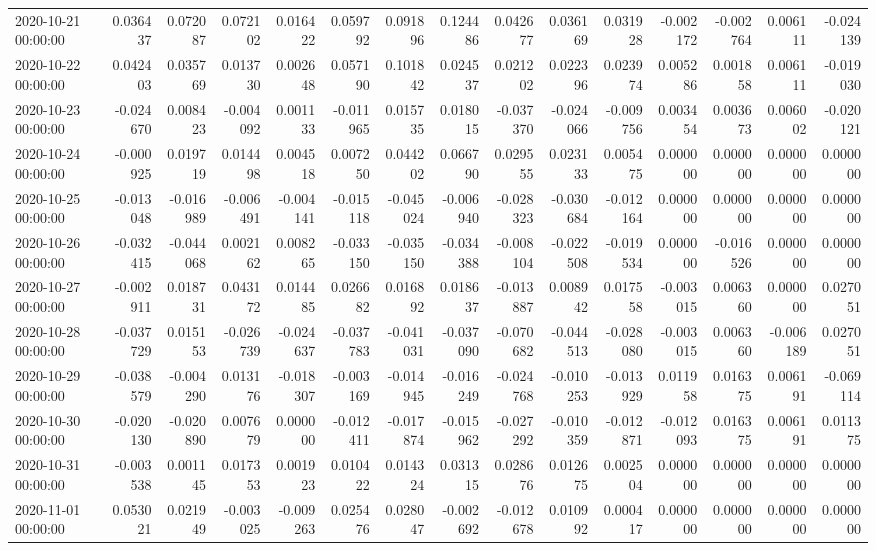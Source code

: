 \begin{tabular}{lrrrrrrrrrrrrrr}
2020-10-21 00:00:00 & 0.036437 & 0.072087 & 0.072102 & 0.016422 & 0.059792 & 0.091896 & 0.124486 & 0.042677 & 0.036169 & 0.031928 & -0.002172 & -0.002764 & 0.006111 & -0.024139 \\
2020-10-22 00:00:00 & 0.042403 & 0.035769 & 0.013730 & 0.002648 & 0.057190 & 0.101842 & 0.024537 & 0.021202 & 0.022396 & 0.023974 & 0.005286 & 0.001858 & 0.006111 & -0.019030 \\
2020-10-23 00:00:00 & -0.024670 & 0.008423 & -0.004092 & 0.001133 & -0.011965 & 0.015735 & 0.018015 & -0.037370 & -0.024066 & -0.009756 & 0.003454 & 0.003673 & 0.006002 & -0.020121 \\
2020-10-24 00:00:00 & -0.000925 & 0.019719 & 0.014498 & 0.004518 & 0.007250 & 0.044202 & 0.066790 & 0.029555 & 0.023133 & 0.005475 & 0.000000 & 0.000000 & 0.000000 & 0.000000 \\
2020-10-25 00:00:00 & -0.013048 & -0.016989 & -0.006491 & -0.004141 & -0.015118 & -0.045024 & -0.006940 & -0.028323 & -0.030684 & -0.012164 & 0.000000 & 0.000000 & 0.000000 & 0.000000 \\
2020-10-26 00:00:00 & -0.032415 & -0.044068 & 0.002162 & 0.008265 & -0.033150 & -0.035150 & -0.034388 & -0.008104 & -0.022508 & -0.019534 & 0.000000 & -0.016526 & 0.000000 & 0.000000 \\
2020-10-27 00:00:00 & -0.002911 & 0.018731 & 0.043172 & 0.014485 & 0.026682 & 0.016892 & 0.018637 & -0.013887 & 0.008942 & 0.017558 & -0.003015 & 0.006360 & 0.000000 & 0.027051 \\
2020-10-28 00:00:00 & -0.037729 & 0.015153 & -0.026739 & -0.024637 & -0.037783 & -0.041031 & -0.037090 & -0.070682 & -0.044513 & -0.028080 & -0.003015 & 0.006360 & -0.006189 & 0.027051 \\
2020-10-29 00:00:00 & -0.038579 & -0.004290 & 0.013176 & -0.018307 & -0.003169 & -0.014945 & -0.016249 & -0.024768 & -0.010253 & -0.013929 & 0.011958 & 0.016375 & 0.006191 & -0.069114 \\
2020-10-30 00:00:00 & -0.020130 & -0.020890 & 0.007679 & 0.000000 & -0.012411 & -0.017874 & -0.015962 & -0.027292 & -0.010359 & -0.012871 & -0.012093 & 0.016375 & 0.006191 & 0.011375 \\
2020-10-31 00:00:00 & -0.003538 & 0.001145 & 0.017353 & 0.001923 & 0.010422 & 0.014324 & 0.031315 & 0.028676 & 0.012675 & 0.002504 & 0.000000 & 0.000000 & 0.000000 & 0.000000 \\
2020-11-01 00:00:00 & 0.053021 & 0.021949 & -0.003025 & -0.009263 & 0.025476 & 0.028047 & -0.002692 & -0.012678 & 0.010992 & 0.000417 & 0.000000 & 0.000000 & 0.000000 & 0.000000 \\

\end{tabular}
